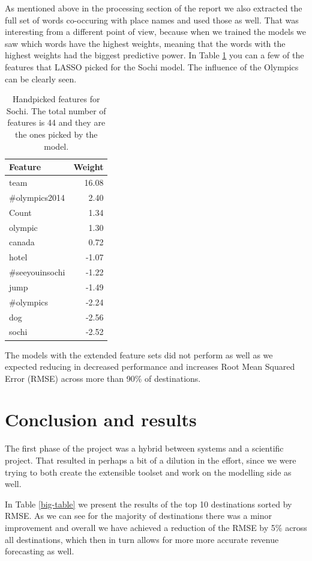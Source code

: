 \documentclass[minf,twoside,singlespacing,parskip,frontabs,notimes,12pt]{infthesis} %
\begin{document}
As mentioned above in the processing section of the report we also extracted the full set of words co-occuring with place names and used those as well. That was interesting from a different point of view, because when we trained the models we saw which words have the highest weights, meaning that the words with the highest weights had the biggest predictive power. In Table \ref{tab:sochi-table} you can a few of the features that LASSO picked for the Sochi model. The influence of the Olympics can be clearly seen. 


\begin{table}[]
\begin{center}
\begin{tabular}{l | r}
Feature & Weight\\
\hline
team & 16.08\\
\#olympics2014 & 2.40\\
Count & 1.34\\
olympic & 1.30\\
canada & 0.72\\
hotel & -1.07\\
\#seeyouinsochi & -1.22\\
jump & -1.49\\
\#olympics & -2.24\\
dog & -2.56\\
sochi & -2.52\\
\end{tabular}
\end{center}
\caption{Handpicked features for Sochi. The total number of features is 44 and they are the ones picked by the model. } 
\label{tab:sochi-table}
\end{table}

The models with the extended feature sets did not perform as well as we expected reducing in decreased performance and increases Root Mean Squared Error (RMSE) across more than 90\% of destinations.


\section{Conclusion and results}


The first phase of the project was a hybrid between systems and a scientific project. That resulted in perhaps a bit of a dilution in the effort, since we were trying to both create the extensible toolset and work on the modelling side as well. 

In Table \ref{big-table} we present the results of the top 10 destinations sorted by RMSE. As we can see for the majority of destinations there was a minor improvement and overall we have achieved a reduction of the RMSE by 5\% across all destinations, which then in turn allows for more more accurate revenue forecasting as well. 
\end{document}
